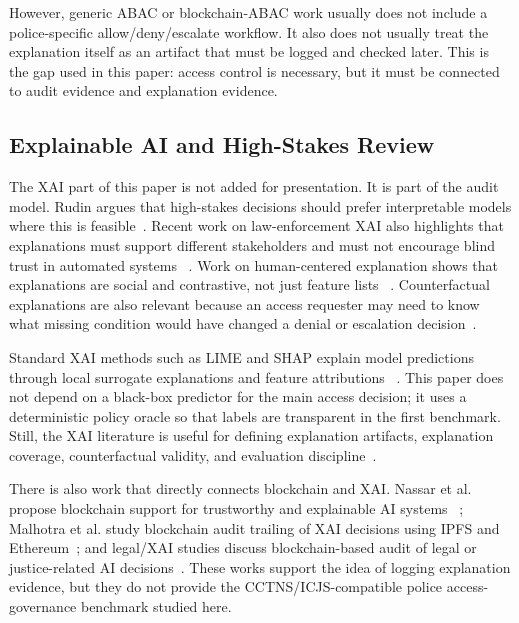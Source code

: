 However, generic ABAC or blockchain-ABAC work usually does not include a
police-specific allow/deny/escalate workflow. It also does not usually treat
the explanation itself as an artifact that must be logged and checked later.
This is the gap used in this paper: access control is necessary, but it must be
connected to audit evidence and explanation evidence.

\subsection{Explainable AI and High-Stakes Review}

The XAI part of this paper is not added for presentation. It is part of the
audit model. Rudin argues that high-stakes decisions should prefer
interpretable models where this is feasible~\cite{rudin_2019}. Recent work on
law-enforcement XAI also highlights that explanations must support different
stakeholders and must not encourage blind trust in automated systems
~\cite{zocholl_xai_law_enforcement_2025}. Work on human-centered explanation
shows that explanations are social and contrastive, not just feature lists
~\cite{miller_xai_social_2019}. Counterfactual explanations are also relevant
because an access requester may need to know what missing condition would have
changed a denial or escalation decision~\cite{wachter_counterfactual_2018}.

Standard XAI methods such as LIME and SHAP explain model predictions through
local surrogate explanations and feature attributions
~\cite{ribeiro_lime_2016,lundberg_shap_2017}. This paper does not depend on a
black-box predictor for the main access decision; it uses a deterministic policy
oracle so that labels are transparent in the first benchmark. Still, the XAI
literature is useful for defining explanation artifacts, explanation coverage,
counterfactual validity, and evaluation discipline~\cite{doshi_velez_interpretability_2017}.

There is also work that directly connects blockchain and XAI. Nassar et al.
propose blockchain support for trustworthy and explainable AI systems
~\cite{nassar_blockchain_xai_2020}; Malhotra et al. study blockchain audit
trailing of XAI decisions using IPFS and Ethereum~\cite{malhotra_xai_audit_2021};
and legal/XAI studies discuss blockchain-based audit of legal or justice-related
AI decisions~\cite{sachan_legal_ai_blockchain_2024,demertzis_xai_justice_2023}.
These works support the idea of logging explanation evidence, but they do not
provide the CCTNS/ICJS-compatible police access-governance benchmark studied here.

